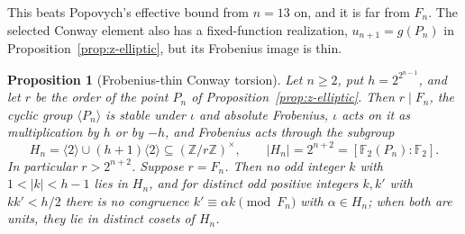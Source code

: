 \documentclass[11pt]{article}
\newtheorem{proposition}[theorem]{Proposition}
\theoremstyle{definition}
\theoremstyle{remark}
\begin{document}
This beats Popovych's effective bound from $n=13$ on, and it is far from
$F_n$.  The selected Conway element also has a fixed-function realization,
$u_{n+1}=g(P_n)$ in Proposition~\ref{prop:z-elliptic}, but its Frobenius
image is thin.

\begin{proposition}[Frobenius-thin Conway torsion]
\label{prop:z-voloch-boundary}
Let $n\geq2$, put $h=2^{2^{n-1}}$, and let $r$ be the order of the point
$P_n$ of Proposition~\ref{prop:z-elliptic}.  Then $r\mid F_n$, the cyclic
group $\langle P_n\rangle$ is stable under $\iota$ and absolute Frobenius,
$\iota$ acts on it as multiplication by $h$ or by $-h$, and Frobenius acts
through the subgroup
\[
 H_n=\langle2\rangle\cup(h+1)\langle2\rangle
 \subseteq(\mathbb Z/r\mathbb Z)^{\times},
 \qquad |H_n|=2^{n+2}=[\mathbb F_2(P_n):\mathbb F_2].
\]
In particular $r>2^{n+2}$.  Suppose $r=F_n$.  Then no odd integer $k$ with
$1<|k|<h-1$ lies in $H_n$, and for distinct odd positive integers $k,k'$
with $kk'<h/2$ there is no congruence $k'\equiv\alpha k\pmod{F_n}$ with
$\alpha\in H_n$; when both are units, they lie in distinct cosets of
$H_n$.
\end{proposition}
\end{document}
